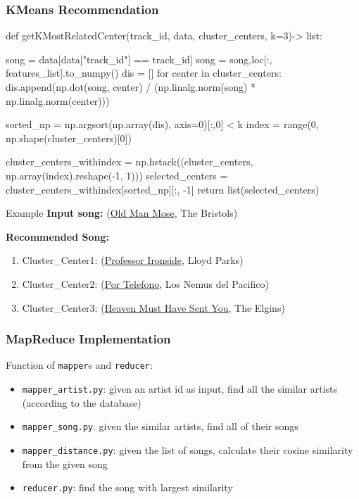 \documentclass{beamer}
\begin{document}
\begin{frame}[fragile]
\frametitle{KMeans Recommendation}
\begin{mycodetiny}
    def getKMostRelatedCenter(track_id, data, cluster_centers, k=3)-> list:

    song = data[data["track_id"] == track_id]
    song = song.loc[:, features_list].to_numpy()
    dis = []
    for center in cluster_centers:
        dis.append(np.dot(song, center) / (np.linalg.norm(song) * np.linalg.norm(center)))
    
    sorted_np = np.argsort(np.array(dis), axis=0)[:,0] < k
    index = range(0, np.shape(cluster_centers)[0])

    cluster_centers_withindex = np.hstack((cluster_centers, np.array(index).reshape(-1, 1)))
    selected_centers = cluster_centers_withindex[sorted_np][:, -1]
    return list(selected_centers)
    
\end{mycodetiny}

\end{frame}


\begin{frame}{Example}
    \textbf{Input song:} (\href{https://music.163.com/#/song?id=1328484856}{Old Man Mose}, The Bristols)
    \bigskip
    
    \textbf{Recommended Song:}
    \begin{enumerate}
        \item Cluster\_Center1: (\href{https://music.163.com/song?id=5193056&userid=1763329628}{Professor Ironside}, Lloyd Parks)
        \item Cluster\_Center2: (\href{https://music.163.com/song?id=537994085&userid=1763329628}{Por Telefono}, Los Nemus del Pacifico) 
        \item Cluster\_Center3: (\href{https://music.163.com/song?id=26714968&userid=1763329628}{Heaven Must Have Sent You}, The Elgins)
        
    \end{enumerate}
\vspace{0.35cm}
\end{frame}




\begin{frame}[fragile]

\frametitle{MapReduce Implementation}

Function of \verb|mapper|s and \verb|reducer|:
\begin{itemize}
    \item \verb|mapper_artist.py|: given an artist id as input, find all the similar artists (according to the database)
    \item \verb|mapper_song.py|: given the similar artists, find all of their songs
    \item \verb|mapper_distance.py|: given the list of songs, calculate their cosine similarity from the given song
    \item \verb|reducer.py|: find the song with largest similarity
\end{itemize}

    
\end{frame}
\end{document}
